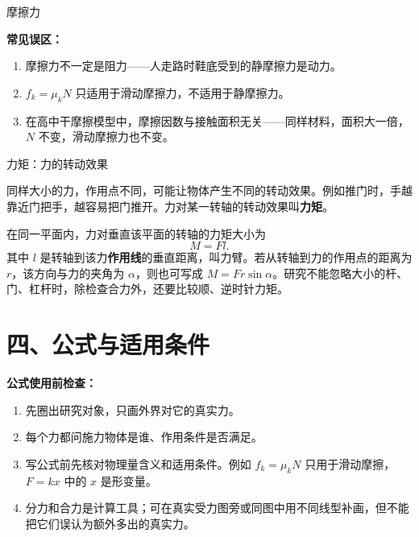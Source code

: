 \begin{conceptbox}{摩擦力}
\begin{center}
\label{fig:static-friction-adaptive}
\end{center}

\textbf{常见误区：}
\begin{enumerate}
  \item 摩擦力不一定是阻力——人走路时鞋底受到的静摩擦力是动力。
  \item $f_k = \mu_k N$ 只适用于滑动摩擦力，不适用于静摩擦力。
  \item 在高中干摩擦模型中，摩擦因数与接触面积无关——同样材料，面积大一倍，$N$ 不变，滑动摩擦力也不变。
\end{enumerate}

\end{conceptbox}

\begin{conceptbox}{力矩：力的转动效果}

同样大小的力，作用点不同，可能让物体产生不同的转动效果。例如推门时，手越靠近门把手，越容易把门推开。力对某一转轴的转动效果叫\textbf{力矩}。

在同一平面内，力对垂直该平面的转轴的力矩大小为
\[
M=Fl.
\]
其中 $l$ 是转轴到该力\textbf{作用线}的垂直距离，叫力臂。若从转轴到力的作用点的距离为 $r$，该方向与力的夹角为 $\alpha$，则也可写成 $M=Fr\sin\alpha$。研究不能忽略大小的杆、门、杠杆时，除检查合力外，还要比较顺、逆时针力矩。

\end{conceptbox}

\section*{四、公式与适用条件}

\textbf{公式使用前检查：}
\begin{enumerate}
  \item 先圈出研究对象，只画外界对它的真实力。
  \item 每个力都问施力物体是谁、作用条件是否满足。
  \item 写公式前先核对物理量含义和适用条件。例如 $f_k=\mu_kN$ 只用于滑动摩擦，$F=kx$ 中的 $x$ 是形变量。
  \item 分力和合力是计算工具；可在真实受力图旁或同图中用不同线型补画，但不能把它们误认为额外多出的真实力。
\end{enumerate}

